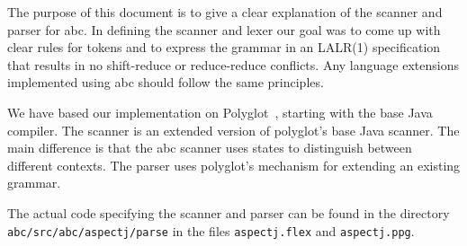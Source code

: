 The purpose of this document is to give a clear explanation of the scanner
and parser for abc.    In defining the scanner and lexer our goal was to
come up with clear rules for tokens and to express the grammar in an
LALR(1) specification that results in no shift-reduce or reduce-reduce
conflicts.   Any language extensions implemented using abc should follow
the same principles.

We have based our implementation on Polyglot~\cite{Nystrom:2003:PEC}, 
starting with the base Java compiler.   The scanner is an extended version
of polyglot's base Java scanner.   The main difference is that the abc
scanner uses states to distinguish between different contexts.  The parser
uses polyglot's mechanism for extending an existing grammar.

The actual code specifying the scanner and parser can be found in the
directory \texttt{abc/src/abc/\-aspectj/parse} in the 
files \texttt{aspectj.flex} and \texttt{aspectj.ppg}.
